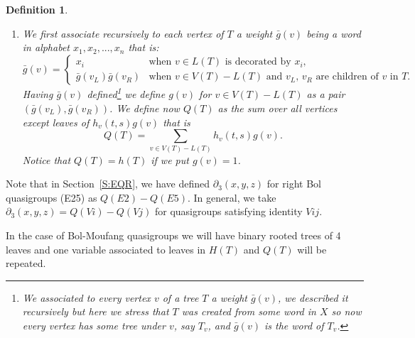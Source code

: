 \documentclass[11pt]{amsart}
\newtheorem{definition}[theorem]{Definition}
\theoremstyle{definition}
\begin{document}
\begin{definition}
\begin{enumerate}
\item[(Q)] We first associate recursively to each 
vertex of $T$ a weight $\bar g(v)$ being a word in alphabet 
$x_1,x_2,...,x_n$ that is:
\[
\bar g(v)=
\left\{
\begin{array}{ll}
x_i & \mbox{when $v\in L(T)$ is decorated by $x_i$},\\
\bar g(v_L)\bar g(v_R) & \mbox{when $v\in V(T)-L(T)$ and $v_L$, $v_R$ are children of $v$ in $T$}.
\end{array}
\right.
\]
Having $\bar g(v)$ defined\footnote{We associated to 
every vertex $v$ of a tree $T$ a weight $\bar g(v)$, we described it recursively but here we stress that $T$ was created from some word in $X$ so now every vertex has some tree under $v$, say $T_v$, and $\bar g(v)$ is the word of $T_v$.} we define $g(v)$ for $v\in V(T)-L(T)$ as a pair 
$(\bar g(v_L),\bar g(v_R))$.
 We define now $Q(T)$ as the sum over 
all vertices except leaves of $h_v(t,s)g(v)$ that is 
$$Q(T)=\sum_{v\in V(T)-L(T)} h_v(t,s)g(v).$$
Notice that $Q(T)= h(T)$ if we put $g(v)=1$.
\end{enumerate}
\end{definition}
Note that in Section~\ref{S:EQR}, we have defined $\partial_3(x,y,z)$ for right Bol quasigroups (E25) as $Q(E2) - Q(E5)$. In general, we take $\partial_3(x,y,z) = Q(Vi) - Q(Vj)$ for quasigroups satisfying identity $Vij$. 

In the case of Bol-Moufang quasigroups we will have binary rooted trees of 4 leaves and one variable associated to leaves in $H(T)$ and $Q(T)$ will be repeated.
\end{document}

